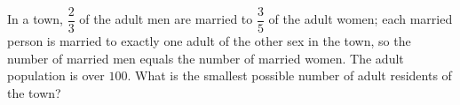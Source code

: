 In a town, $\dfrac{2}{3}$ of the adult men are married to $\dfrac{3}{5}$ of the adult women; each married person is married to exactly one adult of the other sex in the town, so the number of married men equals the number of married women. The adult population is over $100$. What is the smallest possible number of adult residents of the town?
